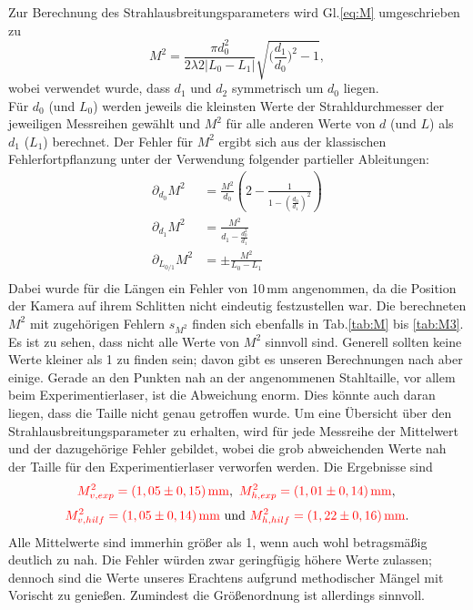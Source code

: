 Zur Berechnung des Strahlausbreitungsparameters wird Gl.\ref{eq:M} umgeschrieben zu
\begin{equation*}
    M^2 = \frac{\pi d_0^2}{2 \lambda 2|L_0-L_1| } \sqrt{\biggl(\frac{d_1}{d_0}\biggl)^2-1},
\end{equation*}
wobei verwendet wurde, dass $d_1$ und $d_2$ symmetrisch um $d_0$ liegen.\\
Für $d_0$ (und $L_0$) werden jeweils die kleinsten Werte der Strahldurchmesser der jeweiligen Messreihen gewählt und $M^2$ für alle anderen Werte von $d$ (und $L$) als 
$d_1$ ($L_1$) berechnet. Der Fehler für $M^2$ ergibt sich aus der klassischen Fehlerfortpflanzung unter der Verwendung folgender partieller Ableitungen:
\begin{align*}
    \partial_{d_0}M^2 &= \frac{M^2}{d_0}(2-\frac{1}{1-(\frac{d_0}{d_1})^2}) \\
    \partial_{d_1}M^2 &= \frac{M^2}{d_1 - \frac{d_0^2}{d_1}} \\
    \partial_{L_{0/1}}M^2 &= \pm \frac{M^2}{L_0-L_1} \\
\end{align*}
Dabei wurde für die Längen ein Fehler von 10\,mm angenommen, da die Position der Kamera auf ihrem Schlitten nicht eindeutig festzustellen war. 
Die berechneten $M^2$ mit zugehörigen Fehlern $s_{M^2}$ finden sich ebenfalls in Tab.\ref{tab:M} bis \ref{tab:M3}.
Es ist zu sehen, dass nicht alle Werte von $M^2$ sinnvoll sind. Generell sollten keine Werte kleiner als 1 zu finden sein; davon gibt es unseren Berechnungen nach aber einige. 
Gerade an den Punkten nah an der angenommenen Stahltaille, vor allem beim Experimentierlaser, ist die Abweichung enorm. Dies könnte auch daran liegen, dass die Taille nicht genau getroffen wurde. Um eine Übersicht 
über den Strahlausbreitungsparameter zu erhalten, wird für jede Messreihe der Mittelwert und der dazugehörige Fehler gebildet, wobei die grob abweichenden Werte nah der Taille für den 
Experimentierlaser verworfen werden. Die Ergebnisse sind 
\begin{equation*}
    \textcolor{red}{M^2_{v,exp} = (1,05 \pm 0,15)\,\mathrm{mm}} , \,\, \textcolor{red}{ M^2_{h,exp} = (1,01 \pm 0,14)\,\mathrm{mm}},\\
\end{equation*}
\begin{equation*}
    \textcolor{red}{M^2_{v,hilf} = (1,05 \pm 0,14)\,\mathrm{mm}}\,\,\mathrm{und}\,\,\textcolor{red}{ M^2_{h,hilf} = (1,22 \pm 0,16)\,\mathrm{mm}}.\\    
\end{equation*}
Alle Mittelwerte sind immerhin größer als 1, wenn auch wohl betragsmäßig deutlich zu nah. 
Die Fehler würden zwar geringfügig höhere Werte zulassen; dennoch sind die Werte unseres Erachtens aufgrund methodischer Mängel mit Vorischt zu genießen. Zumindest die 
Größenordnung ist allerdings sinnvoll.

